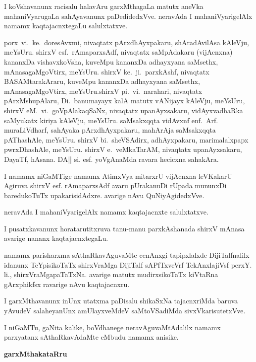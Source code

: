 I koVshavanunx racisalu halavAru garxMthagaLa matutx aneVka mahaniVyarugaLa sahAyavanunx paDedidedxVve. neravAda I mahaniVyarigelAlx namamx kaqtajacnxtegaLu salulxtatxve.

porx\ vi.~ke.\ doresAvxmi, nivaqtatx pArxdhAyxpakaru, shAradAvilAsa kAleVju, meYsUru. shirxV esf.\ rAmaparxsAdf, nivaqtatx saMpAdakaru (vijAcnxna) kananxDa vishavxkoVsha, kuveMpu kananxDa adhayxyana saMsethx, mAnasagaMgoVtirx, meYsUru. shirxV ke.~ji.\ parxkAshf, nivaqtatx BASAMtarakAraru, kuveMpu kananxDa adhayxyana saMsethx, mAnasagaMgoVtirx, meYsUru.\break shirxV pi.~vi.\ narahari, nivaqtatx pArxMshupAlaru, Di.~banumayayx kalA matutx vANijayx kAleVju, meYsUru, shirxV eM.~vi.\ goVpAlakaqSaNx, nivaqtatx upanAyxsakaru, vidAyxvadhaRka saMyukatx kiriya kAleVju, meYsUru. saMsakxqqta vidAvxnf enf.~Arf. muraLiVdharf, sahAyaka pArxdhAyxpakaru, mahArAja saMsakxqqta pAThashAle, meYsUru. shirxV bi.\ sheVSAdirx, adhAyxpakaru, marimalalxpapx pwrxDhashAle, meYsUru. shirxV e.\ veMkaTarAM, nivaqtatx upanAyxsakaru, DayaTf, hAsana. DA|| si. esf. yoVgAnaMda ravara hecicxna sahakAra.

I namamx niGaMTige namamx AtimxVya mitarxrU vijAcnxna leVKakarU Agiruva shirxV esf. rAmaparxsAdf avaru pUrakanuDi rUpada mununxDi baredukoTuTx upakarisidAdxre. avarige nAvu QuNiyAgidedxVve.

neravAda I mahaniVyarigelAlx namamx kaqtajacnxte salulxtatxve.

I pusatxkavanunx horatarutitxruva tanu-manu parxkAshanada shirxV mAnasa avarige nananx kaqtajacnxtegaLu.

namamx parisharxma sAthaRkavAguvaMte cenAnxgi tapipxlalxde DijiTalfnalilx idanunx TeYpisikoTaTx  shirxVraMga DijiTalf sAPfTxveVrf TekAnxlajiVsf perxY. li., shirxVraMgapaTaTxNa. avarige matutx mudirxsikoTaTx  kiVtaRna gArxphikfsx ravarige nAvu kaqtajacnxru.

I garxMthavanunx inUnx utatxma paDisalu shikaSxNa tajacnxriMda baruva yAvudeV salaheyanUnx amUlayxveMdeV saMtoVSadiMda sivxVkarisutetxVve.

I niGaMTu,  gaNita kalike, boVdhanege neravAguvaMtAdalilx namamx parxyatanx sAthaRkavAdaMte eMbudu namamx anisike.

\vskip 1.5cm

\noindent
{}\hfill {\Large\bf garxMthakataRru}\qquad\qquad\,





